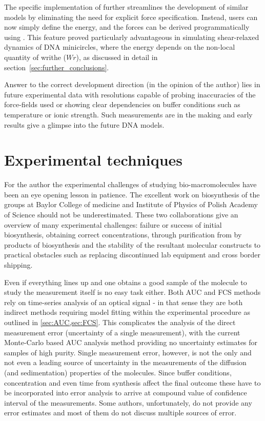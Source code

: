 \documentclass{doctoral}
\newcommand{\code}[1]{\texttt{\detokenize{#1}}}
\begin{document}
The specific implementation of \code{pychastic} further streamlines the development of similar models by eliminating the need for explicit force specification.
Instead, users can now simply define the energy, and the forces can be derived programmatically using \code{jax.grad}.
This feature proved particularly advantageous in simulating shear-relaxed dynamics of DNA minicircles, where the energy depends on the non-local quantity of writhe ($Wr$), as discussed in detail in section~\ref{sec:further_conclusions}.

Answer to the correct development direction (in the opinion of the author) lies in future experimental data with resolutions capable of probing inaccuracies of the force-fields used or showing clear dependencies on buffer conditions such as temperature or ionic strength.
Such measurements are in the making and early results give a glimpse into the future DNA models\cite{Ranasinghe_2023}.

\section{Experimental techniques}

For the author the experimental challenges of studying bio-macromolecules have been an eye opening lesson in patience.
The excellent work on biosynthesis of the groups at Baylor College of medicine and Institute of Physics of Polish Academy of Science should not be underestimated.
These two collaborations give an overview of many experimental challenges: failure or success of initial biosynthesis, obtaining correct concentrations, through purification from by products of biosynthesis and the stability of the resultant molecular constructs to practical obstacles such as replacing discontinued lab equipment and cross border shipping.

Even if everything lines up and one obtains a good sample of the molecule to study the measurement itself is no easy task either.
Both AUC and FCS methods rely on time-series analysis of an optical signal - in that sense they are both indirect methods requiring model fitting within the experimental procedure as outlined in \ref{sec:AUC,sec:FCS}.
This complicates the analysis of the direct measurement error (uncertainty of a single measurement), with the current Monte-Carlo based AUC analysis method providing no uncertainty estimates for samples of high purity.
Single measurement error, however, is not the only and not even a leading source of uncertainty in the measurements of the diffusion (and sedimentation) properties of the molecules.
Since buffer conditions, concentration and even time from synthesis\cite{Nag_2011} affect the final outcome these have to be incorporated into error analysis to arrive at compound value of confidence interval of the measurements.
Some authors, unfortunately, do not provide any error estimates\cite{Poznar_2017,Khaymina_2007} and most of them do not discuss multiple sources of error.
\end{document}
